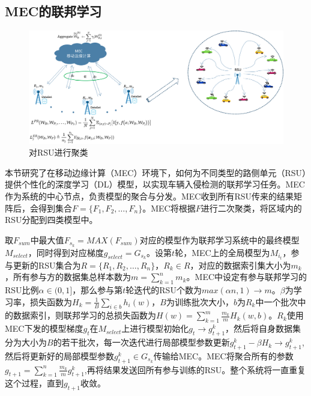 \subsection{MEC的联邦学习}

\begin{figure}[htb]
\centering
    \includegraphics[scale=0.65]{figures/chapter3/chapter3.png}
    \caption{对RSU进行聚类}
    \label{fig:Cluster the cars in the region}
\end{figure}

本节研究了在移动边缘计算（MEC）环境下，如何为不同类型的路侧单元（RSU）提供个性化的深度学习（DL）模型，以实现车辆入侵检测的联邦学习任务。MEC作为系统的中心节点，负责模型的聚合与分发。MEC收到所有RSU传来的结果矩阵后，会得到集合$F=\{F_1,F_2,\dots,F_n\}$。MEC将根据$F$进行二次聚类，将区域内的RSU分配到四类模型中。

取$F_{sum}$中最大值$F_{s_k}= MAX(F_{sum})$对应的模型作为联邦学习系统中的最终模型$M_{select}$，同时得到对应梯度$ g_{select}= G_{s_k}$。设第$t$轮，MEC上的全局模型为$M_{i_t}$，参与更新的RSU集合为$R=\{R_1,R_2,\dots,R_n\}$，$R_k \in R$，对应的数据索引集大小为$m_k$，所有参与方的数据集总样本数为$m=\sum_{k=1}^{n}m_k$。MEC中设定有参与联邦学习的RSU比例$\alpha \in (0,1]$，那么参与第$t$轮迭代的RSU个数为$max(\alpha n,1)\to m$。$\beta$为学习率，损失函数为$H_k=\frac{1}{B}\sum_{i \in b }h_i(w)  $，$B$为训练批次大小，$b $为$R_k$中一个批次中的数据索引，则联邦学习的总损失函数为$H(w)=\sum_{k=1}^{m} \frac{m_k}{m}H_k(w,b)$。$R_k$使用MEC下发的模型梯度$g_t$在$ M_{select}$上进行模型初始化$g_t \to g_{t+1}^k$，然后将自身数据集分为大小为$B$的若干批次，每一次迭代进行局部模型参数更新$g_{t+1}^{k}-\beta H_{k}\to g_{t+1}^{k}$,然后将更新好的局部模型参数$g_{t+1}^k \in G_{s_k}$传输给MEC。MEC将聚合所有的参数$g_{t+1}=\sum_{k=1}^{n}\frac{m_k}{m}g_{t+1}^k$,再将结果发送回所有参与训练的RSU。整个系统将一直重复这个过程，直到$g_{t+1}$收敛。

